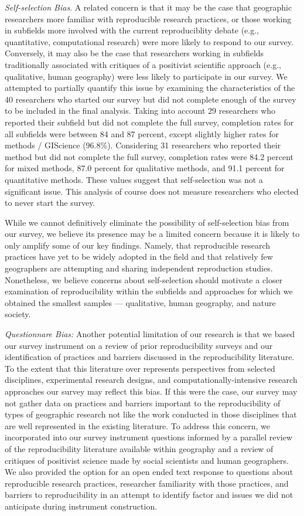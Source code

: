 \textit{Self-selection Bias}. A related concern is that it may be the case that geographic researchers more familiar with reproducible research practices, or those working in subfields more involved with the current reproduciblity debate (e.g., quantitative, computational research) were more likely to respond to our survey. 
Conversely, it may also be the case that researchers working in subfields traditionally associated with critiques of a positivist scientific approach (e.g., qualitative, human geography) were less likely to participate in our survey. 
We attempted to partially quantify this issue by examining the characteristics of the 40 researchers who started our survey but did not complete enough of the survey to be included in the final analysis.
Taking into account 29 researchers who reported their subfield but did not complete the full survey, completion rates for all subfields were between 84 and 87 percent, except slightly higher rates for methods / GIScience (96.8\%).
Considering 31 researchers who reported their method but did not complete the full survey, completion rates were 84.2 percent for mixed methods, 87.0 percent for qualitative methods, and 91.1 percent for quantitative methods. 
These values suggest that self-selection was not a significant issue.
This analysis of course does not measure researchers who elected to never start the survey.

While we cannot definitively eliminate the possibility of self-selection bias from our survey, we believe its presence may be a limited concern because it is likely to only amplify some of our key findings. 
Namely, that reproducible research practices have yet to be widely adopted in the field and that relatively few geographers are attempting and sharing independent reproduction studies.
Nonetheless, we believe concerns about self-selection should motivate a closer examination of reproducibility within the subfields and approaches for which we obtained the smallest samples --- qualitative, human geography, and nature society.  

\textit{Questionnare Bias:} Another potential limitation of our research is that we based our survey instrument on a review of prior reproducibility surveys and our identification of practices and barriers discussed in the reproducibility literature. 
To the extent that this literature over represents perspectives from selected disciplines, experimental research designs, and computationally-intensive research approaches our survey may reflect this bias. 
If this were the case, our survey may not gather data on practices and barriers important to the reproducibility of types of geographic research not like the work conducted in those disciplines that are well represented in the existing literature. 
To address this concern, we incorporated into our survey instrument questions informed by a parallel review of the reproducibility literature available within geography and a review of critiques of positivist science made by social scientists and human geographers.
We also provided the option for an open ended text response to questions about reproducible research practices, researcher familiarity with those practices, and barriers to reproducibility in an attempt to identify factor and issues we did not anticipate during instrument construction.  
